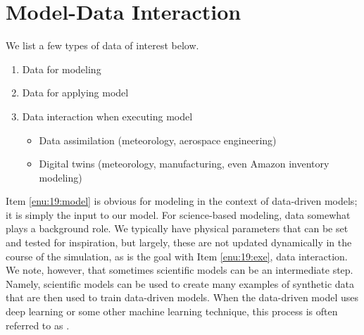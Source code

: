 \section{Model-Data Interaction}
We list a few types of data of interest below.
\begin{enumerate}
    \item Data for modeling \label{enu:19:model}
    \item Data for applying model \label{enu:19:applymodel}
    \item Data interaction when executing model \label{enu:19:exe}
        \begin{itemize}
            \item Data assimilation (meteorology, aerospace engineering)
            \item Digital twins (meteorology, manufacturing, even Amazon inventory modeling)
        \end{itemize}
\end{enumerate}
Item \ref{enu:19:model} is obvious for modeling in the context of data-driven models; it is simply the input to our model. For science-based modeling, data somewhat plays a background role. We typically have physical parameters that can be set and tested for inspiration, but largely, these are not updated dynamically in the course of the simulation, as is the goal with Item \ref{enu:19:exe}, data interaction. We note, however, that sometimes scientific models can be an intermediate step. Namely, scientific models can be used to create many examples of synthetic data that are then used to train data-driven models. When the data-driven model uses deep learning or some other machine learning technique, this process is often referred to as .
